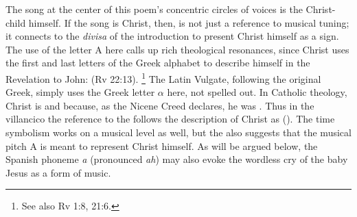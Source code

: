 The song at the center of this poem's concentric circles of voices is the
Christ-child himself.
If the song is Christ, then,  is not
just a reference to musical tuning; it connects to the \emph{divisa} of the
introduction to present Christ himself as a sign.
The use of the letter A here calls up rich theological resonances, since Christ
uses the first and last letters of the Greek alphabet to describe himself in the
Revelation to John:  (Rv 22:13).%
    \footnote{See also Rv 1:8, 21:6.}
The Latin Vulgate, following the original Greek, simply uses the Greek letter
$\alpha$ here, not spelled out.
In Catholic theology, Christ is  and 
because, as the Nicene Creed declares, he was .%
    \Autocite
    [42: .]
    {Catholic:Catechismus1614}
Thus in the villancico the reference to the  follows the
description of Christ as 
().
The time symbolism works on a musical level as well, but the 
also suggests that the musical pitch A is meant to represent Christ himself.
As will be argued below, the Spanish phoneme \emph{a} (pronounced \emph{ah}) may
also evoke the wordless cry of the baby Jesus as a form of music.

